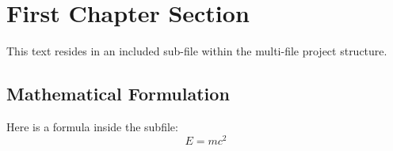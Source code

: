 \section{First Chapter Section}
This text resides in an included sub-file within the multi-file project structure.
\subsection{Mathematical Formulation}
Here is a formula inside the subfile:
\[
E = mc^2
\]

